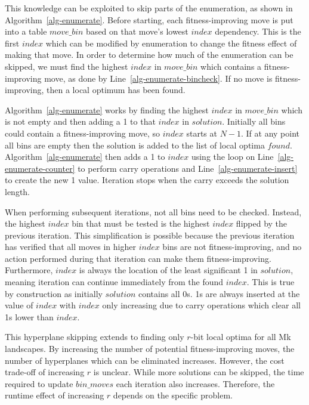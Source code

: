 \documentclass[runningheads,a4paper]{llncs}
\begin{document}
This knowledge can be exploited to skip parts of the enumeration,
as shown in Algorithm~\ref{alg-enumerate}.
Before starting, each fitness-improving move is put into a table $move\_bin$
based on that move's lowest $index$ dependency. This is the first $index$ which
can be modified by enumeration to change the fitness effect of making that move.
In order to determine how much of the enumeration can be skipped, we must find
the highest $index$ in $move\_bin$ which contains a fitness-improving move,
as done by Line~\ref{alg-enumerate-bincheck}. If no move is fitness-improving,
then a local optimum has been found.

Algorithm~\ref{alg-enumerate} works by finding the highest $index$ in $move\_bin$
which is not empty and then adding a 1 to that $index$ in $solution$. Initially
all bins could contain a fitness-improving move, so $index$ starts at $N-1$.
If at any point all bins are empty then the solution is added to the list of
local optima $found$. Algorithm~\ref{alg-enumerate} then
adds a 1 to $index$ using the loop on Line~\ref{alg-enumerate-counter}
to perform carry operations and Line~\ref{alg-enumerate-insert} to create the new 1 value.
Iteration stops when the carry exceeds the solution length.

When performing subsequent iterations, not all bins need to be checked. Instead, the highest $index$
bin that must be tested is the highest $index$ flipped by the previous iteration. This
simplification is possible because
the previous iteration has verified that all moves in higher $index$ bins are not fitness-improving, and no action performed during
that iteration can make them fitness-improving.
Furthermore, $index$ is always the location of the least significant 1 in $solution$, meaning
iteration can continue immediately from the found $index$. This is true by construction
as initially $solution$ contains all 0s. 1s are always inserted at the value of $index$
with $index$ only increasing due to carry operations which clear all 1s lower than $index$.

This hyperplane skipping extends to finding only $r$-bit local optima for all Mk landscapes.
By increasing the number of potential fitness-improving moves, the number of hyperplanes which
can be eliminated increases. However, the cost trade-off of increasing $r$ is unclear.
While more solutions can be skipped, the time required to update $bin\_moves$ each iteration
also increases. Therefore, the runtime effect of increasing $r$
depends on the specific problem.
\end{document}
